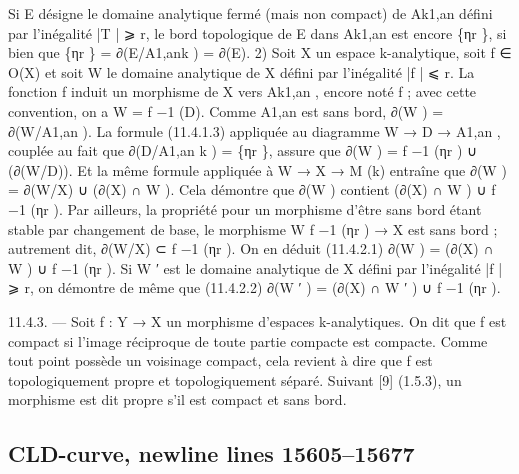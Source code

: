 \documentclass[
  10pt,
]{article}
\newenvironment{Shaded}{}{}
\newcommand{\NormalTok}[1]{#1}
\begin{document}
\begin{Shaded}
\begin{Highlighting}[]
\NormalTok{   Si E désigne le domaine analytique fermé (mais non compact) de Ak1,an défini par}
\NormalTok{l’inégalité |T | ⩾ r, le bord topologique de E dans Ak1,an est encore \{ηr \}, si bien que}
\NormalTok{\{ηr \} = ∂(E/A1,ank ) = ∂(E).}
\NormalTok{   2) Soit X un espace k{-}analytique, soit f ∈ O(X) et soit W le domaine analytique de X}
\NormalTok{défini par l’inégalité |f | ⩽ r. La fonction f induit un morphisme de X vers Ak1,an , encore}
\NormalTok{noté f ; avec cette convention, on a W = f −1 (D). Comme A1,an est sans bord, ∂(W ) =}
\NormalTok{∂(W/A1,an ). La formule (11.4.1.3) appliquée au diagramme W → D → A1,an , couplée}
\NormalTok{au fait que ∂(D/A1,an k ) = \{ηr \}, assure que ∂(W ) = f}
\NormalTok{                                                          −1}
\NormalTok{                                                             (ηr ) ∪ (∂(W/D)). Et la même}
\NormalTok{formule appliquée à W → X → M (k) entraîne que ∂(W ) = ∂(W/X) ∪ (∂(X) ∩ W ).}
\NormalTok{Cela démontre que ∂(W ) contient (∂(X) ∩ W ) ∪ f −1 (ηr ). Par ailleurs, la propriété pour}
\NormalTok{un morphisme d’être sans bord étant stable par changement de base, le morphisme}
\NormalTok{W f −1 (ηr ) → X est sans bord ; autrement dit, ∂(W/X) ⊂ f −1 (ηr ). On en déduit}
\NormalTok{(11.4.2.1)                        ∂(W ) = (∂(X) ∩ W ) ∪ f −1 (ηr ).}
\NormalTok{Si W ′ est le domaine analytique de X défini par l’inégalité |f | ⩾ r, on démontre de}
\NormalTok{même que}
\NormalTok{(11.4.2.2)                       ∂(W ′ ) = (∂(X) ∩ W ′ ) ∪ f −1 (ηr ).}

\NormalTok{11.4.3. — Soit f : Y → X un morphisme d’espaces k{-}analytiques. On dit que f est}
\NormalTok{compact si l’image réciproque de toute partie compacte est compacte. Comme tout point}
\NormalTok{possède un voisinage compact, cela revient à dire que f est topologiquement propre et}
\NormalTok{topologiquement séparé.}
\NormalTok{  Suivant [9] (1.5.3), un morphisme est dit propre s’il est compact et sans bord.}
\end{Highlighting}
\end{Shaded}

\subsection{CLD-curve, newline lines
15605--15677}\label{cld-curve-newline-lines-1560515677}
\end{document}
